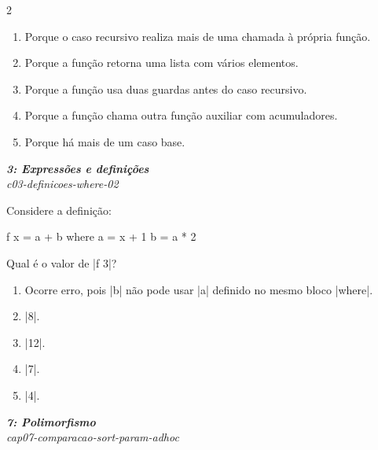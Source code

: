 \documentclass[a4paper,10pt,brazil]{article}
\begin{document}
\begin{multicols}{2}
\begin{enumerate}
  \item Porque o caso recursivo realiza mais de uma chamada à própria função.

  \item Porque a função retorna uma lista com vários elementos.

  \item Porque a função usa duas guardas antes do caso recursivo.

  \item Porque a função chama outra função auxiliar com acumuladores.

  \item Porque há mais de um caso base.


\end{enumerate}

\begin{flushright}
  \footnotesize
  \textit{\textbf{3: Expressões e definições}}\\
  \textit{c03-definicoes-where-02}\\

\end{flushright}
Considere a definição:

\begin{haskellcode}
f x = a + b
  where
    a = x + 1
    b = a * 2
\end{haskellcode}

Qual é o valor de \haskellinline|f 3|?

\begin{enumerate}
  \item Ocorre erro, pois \haskellinline|b| não pode usar \haskellinline|a| definido no mesmo bloco \haskellinline|where|.

  \item \haskellinline|8|.

  \item \haskellinline|12|.

  \item \haskellinline|7|.

  \item \haskellinline|4|.


\end{enumerate}

\begin{flushright}
  \footnotesize
  \textit{\textbf{7: Polimorfismo}}\\
  \textit{cap07-comparacao-sort-param-adhoc}\\


\end{flushright}
\end{multicols}
\end{document}
